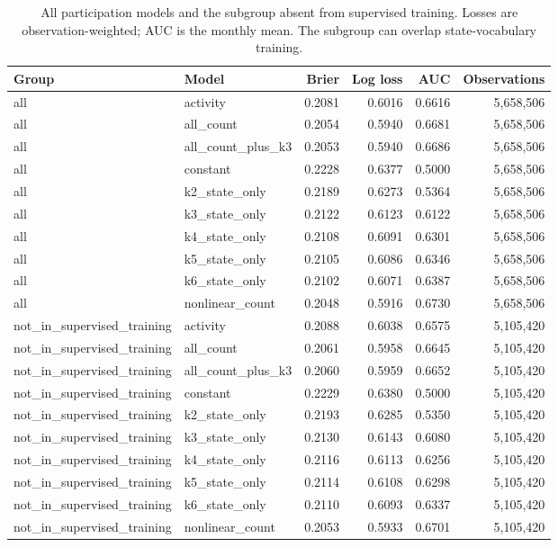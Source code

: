 \documentclass[journal,letterpaper]{IEEEtran}
\begin{document}
\begin{table}[t]
\centering\footnotesize
\caption{All participation models and the subgroup absent from supervised training. Losses are observation-weighted; AUC is the monthly mean. The subgroup can overlap state-vocabulary training.}
\label{tab:suppallprediction}
\begin{tabular}{llrrrr}
\toprule
Group & Model & Brier & Log loss & AUC & Observations \\
\midrule
all & activity & 0.2081 & 0.6016 & 0.6616 & 5,658,506 \\
all & all\_count & 0.2054 & 0.5940 & 0.6681 & 5,658,506 \\
all & all\_count\_plus\_k3 & 0.2053 & 0.5940 & 0.6686 & 5,658,506 \\
all & constant & 0.2228 & 0.6377 & 0.5000 & 5,658,506 \\
all & k2\_state\_only & 0.2189 & 0.6273 & 0.5364 & 5,658,506 \\
all & k3\_state\_only & 0.2122 & 0.6123 & 0.6122 & 5,658,506 \\
all & k4\_state\_only & 0.2108 & 0.6091 & 0.6301 & 5,658,506 \\
all & k5\_state\_only & 0.2105 & 0.6086 & 0.6346 & 5,658,506 \\
all & k6\_state\_only & 0.2102 & 0.6071 & 0.6387 & 5,658,506 \\
all & nonlinear\_count & 0.2048 & 0.5916 & 0.6730 & 5,658,506 \\
not\_in\_supervised\_training & activity & 0.2088 & 0.6038 & 0.6575 & 5,105,420 \\
not\_in\_supervised\_training & all\_count & 0.2061 & 0.5958 & 0.6645 & 5,105,420 \\
not\_in\_supervised\_training & all\_count\_plus\_k3 & 0.2060 & 0.5959 & 0.6652 & 5,105,420 \\
not\_in\_supervised\_training & constant & 0.2229 & 0.6380 & 0.5000 & 5,105,420 \\
not\_in\_supervised\_training & k2\_state\_only & 0.2193 & 0.6285 & 0.5350 & 5,105,420 \\
not\_in\_supervised\_training & k3\_state\_only & 0.2130 & 0.6143 & 0.6080 & 5,105,420 \\
not\_in\_supervised\_training & k4\_state\_only & 0.2116 & 0.6113 & 0.6256 & 5,105,420 \\
not\_in\_supervised\_training & k5\_state\_only & 0.2114 & 0.6108 & 0.6298 & 5,105,420 \\
not\_in\_supervised\_training & k6\_state\_only & 0.2110 & 0.6093 & 0.6337 & 5,105,420 \\
not\_in\_supervised\_training & nonlinear\_count & 0.2053 & 0.5933 & 0.6701 & 5,105,420 \\
\bottomrule
\end{tabular}
\end{table}
\end{document}
